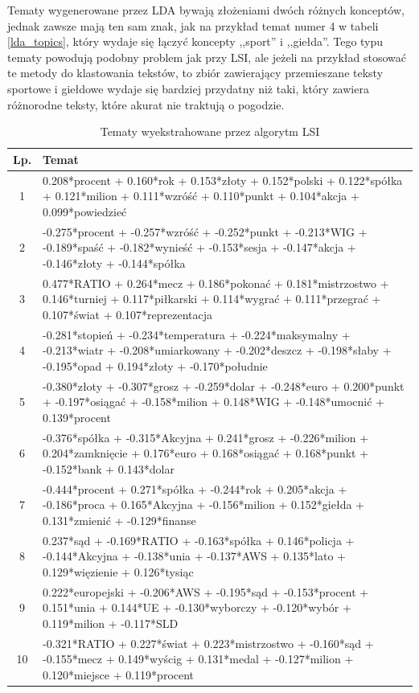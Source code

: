 \documentclass[11pt,a4paper]{article}
\begin{document}
Tematy wygenerowane przez LDA bywają złożeniami dwóch różnych konceptów, jednak
zawsze mają ten sam znak, jak na przykład temat numer 4 w tabeli
\ref{lda_topics}, który wydaje się łączyć koncepty ,,sport'' i ,,giełda''. Tego
typu tematy powodują podobny problem jak przy LSI, ale jeżeli na przykład
stosować te metody do klastowania tekstów, to zbiór zawierający przemieszane
teksty sportowe i giełdowe wydaje się bardziej przydatny niż taki, który zawiera
różnorodne teksty, które akurat nie traktują o pogodzie.

\begin{table}[h]
\caption{Tematy wyekstrahowane przez algorytm LSI}
\label{lsi_topics}
\begin{tabular}{|c|p{\linewidth}|}
\hline
Lp. & Temat \\\hline

1 & 0.208*procent + 0.160*rok + 0.153*złoty + 0.152*polski + 0.122*spółka + 0.121*milion + 0.111*wzróść + 0.110*punkt + 0.104*akcja + 0.099*powiedzieć\\\hline
2 & -0.275*procent + -0.257*wzróść + -0.252*punkt + -0.213*WIG + -0.189*spaść + -0.182*wynieść + -0.153*sesja + -0.147*akcja + -0.146*złoty + -0.144*spółka\\\hline
3 & 0.477*RATIO + 0.264*mecz + 0.186*pokonać + 0.181*mistrzostwo + 0.146*turniej + 0.117*piłkarski + 0.114*wygrać + 0.111*przegrać + 0.107*świat + 0.107*reprezentacja\\\hline
4 & -0.281*stopień + -0.234*temperatura + -0.224*maksymalny + -0.213*wiatr + -0.208*umiarkowany + -0.202*deszcz + -0.198*słaby + -0.195*opad + 0.194*złoty + -0.170*południe\\\hline
5 & -0.380*złoty + -0.307*grosz + -0.259*dolar + -0.248*euro + 0.200*punkt + -0.197*osiągać + -0.158*milion + 0.148*WIG + -0.148*umocnić + 0.139*procent\\\hline
6 & -0.376*spółka + -0.315*Akcyjna + 0.241*grosz + -0.226*milion + 0.204*zamknięcie + 0.176*euro + 0.168*osiągać + 0.168*punkt + -0.152*bank + 0.143*dolar\\\hline
7 & -0.444*procent + 0.271*spółka + -0.244*rok + 0.205*akcja + -0.186*proca + 0.165*Akcyjna + -0.156*milion + 0.152*giełda + 0.131*zmienić + -0.129*finanse\\\hline
8 & 0.237*sąd + -0.169*RATIO + -0.163*spółka + 0.146*policja + -0.144*Akcyjna + -0.138*unia + -0.137*AWS + 0.135*lato + 0.129*więzienie + 0.126*tysiąc\\\hline
9 & 0.222*europejski + -0.206*AWS + -0.195*sąd + -0.153*procent + 0.151*unia + 0.144*UE + -0.130*wyborczy + -0.120*wybór + 0.119*milion + -0.117*SLD\\\hline
10 & -0.321*RATIO + 0.227*świat + 0.223*mistrzostwo + -0.160*sąd + -0.155*mecz + 0.149*wyścig + 0.131*medal + -0.127*milion + 0.120*miejsce + 0.119*procent\\\hline
\end{tabular}
\end{table}
\end{document}
